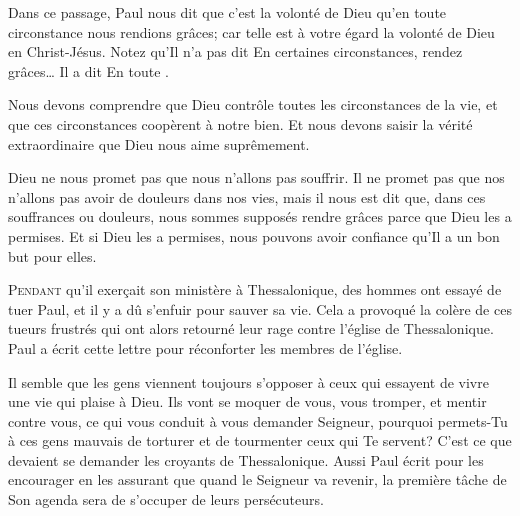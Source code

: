 Dans ce passage, Paul nous dit que c'est la volonté de Dieu \Og qu'en toute
 circonstance nous rendions grâces; car telle est à votre égard la volonté
 de Dieu en Christ-Jésus. \Fg{}
 Notez qu'Il n'a pas dit\frcolon{} 
 \Og En certaines circonstances, rendez grâces\dots{} \Fg{}
 Il a dit\frcolon{}  \Og En toute \Fg{}.


Nous devons comprendre que Dieu contrôle toutes les circonstances de la vie,
 et que ces circonstances coopèrent à notre bien.
 Et nous devons saisir la vérité extraordinaire que Dieu nous aime suprêmement.

Dieu ne nous promet pas que nous n'allons pas souffrir.
 Il ne promet pas que nos n'allons pas avoir de douleurs dans nos vies,
 mais il nous est dit que, dans ces souffrances ou douleurs,
 nous sommes supposés rendre grâces \ocadr parce que Dieu les a permises.
 Et si Dieu les a permises, nous pouvons avoir confiance qu'Il a un bon but
 pour elles.

\dvrule






\lettrine{P}{endant} qu'il exer\c{c}ait son ministère à Thessalonique,
 des hommes ont essayé de tuer Paul, et il y a dû s'enfuir pour sauver sa vie.
 Cela a provoqué la colère de ces tueurs frustrés qui ont alors retourné
 leur rage contre l'église de Thessalonique. Paul a écrit cette lettre
 pour réconforter les membres de l'église.

Il semble que les gens viennent toujours s'opposer à ceux qui essayent
 de vivre une vie qui plaise à Dieu. Ils vont se moquer de vous, vous tromper,
 et mentir contre vous, ce qui vous conduit à  vous demander\frcolon{} 
 \Og Seigneur, pourquoi permets-Tu  à ces gens mauvais de torturer
 et de tourmenter ceux qui Te servent? \Fg{} 
 C'est ce que devaient se demander les croyants de Thessalonique.
 Aussi Paul écrit pour les encourager en les assurant que quand le Seigneur
 va revenir, la première tâche de Son agenda sera de s'occuper
 de leurs persécuteurs.

